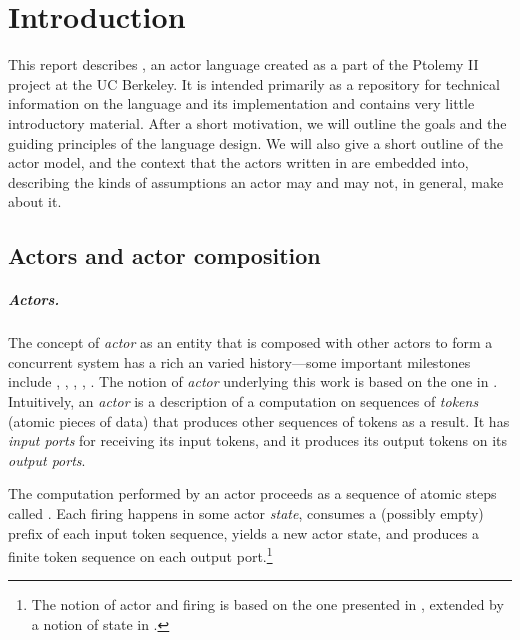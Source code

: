 
\chapter{Introduction}\label{chap:Introduction}

This report describes \Cal, an actor language created as a part of the
 Ptolemy II project \cite{ProjectPtolemy} at the UC
Berkeley. It is intended primarily as a repository for technical
information on the language and its implementation and contains very
little introductory material. After a short motivation, we will
outline the goals and the guiding principles of the language design.
We will also give a short outline of the actor model, and the context
that the actors written in \Cal are embedded into, describing the
kinds of assumptions an actor may and may not, in general, make about
it.

\section{Actors and actor composition}



\paragraph{Actors.} The concept of {\em actor} as an entity
that is composed with other actors to form a concurrent system has a
rich an varied history---some important milestones include
\cite{hewitt77}, \cite{KahnG74}, \cite{AghaGA86}, \cite{AghaGA+93},
\cite{DennisJB75}. The notion of {\em actor}
underlying this work is based on the one in \cite{LeeEA97}.
Intuitively, an {\em actor} is a description of a computation on
sequences of {\em tokens} (atomic pieces of data) that produces other
sequences of tokens as a result. It has  {\em input ports} for
receiving its input tokens, and it produces its output tokens on its
 {\em output ports}.

The computation performed by an actor proceeds as a sequence of atomic
steps called . Each
firing happens in some  actor {\em state}, consumes
a (possibly empty)  prefix of each input token
sequence, yields a new actor state, and produces a finite token
sequence on each output port.\footnote{The notion of actor and firing
  is based on the one presented in \cite{LeeEA97}, extended by a notion
  of state in \cite{JDiss}.}

